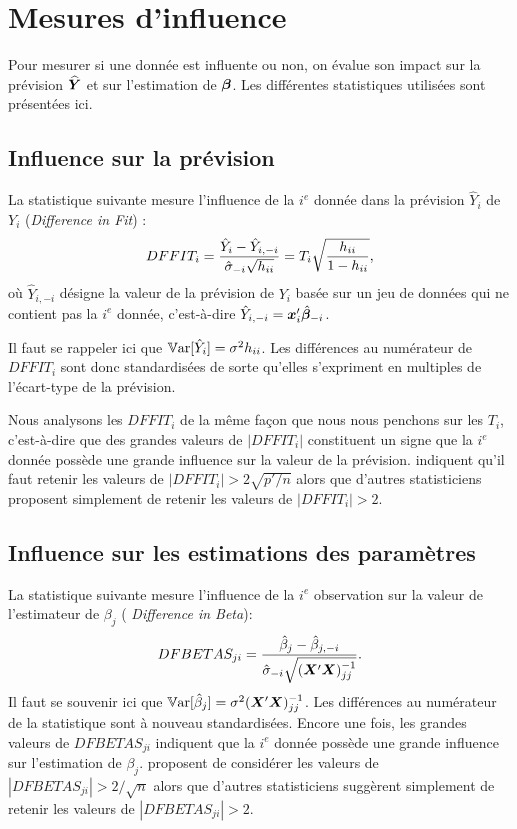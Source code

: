 \section{Mesures d'influence}

Pour mesurer si une donnée est influente ou non, on évalue son impact sur la prévision $\widehat{\bm{Y}}$ et sur l'estimation de $\bm\beta$. Les différentes statistiques utilisées sont présentées ici.

\subsection{Influence sur la prévision}
La statistique suivante mesure l'influence de la $i^e$ donnée
dans la prévision $\hat{Y}_i$ de $Y_i$ (\textit{Difference in Fit}) :
$$DFFIT_i={\hat{Y}_i-\hat{Y}_{i,-i}\over
\hat\sigma_{-i}\sqrt{h_{ii}}}=T_i\sqrt{h_{ii}\over1-h_{ii}},$$ o\`u
$\hat{Y}_{i,-i}$ désigne la valeur de la prévision de $Y_i$ basée
sur un jeu de données qui ne contient pas la $i^e$ donnée,
c'est-à-dire $\hat{Y}_{i,-i}=\bm{x}_i'\hat{\bm\beta}_{-i}$.

Il faut se rappeler ici que $\mathbb{V}\text{ar}[\hat Y_i]=\sigma^2h_{ii}$. Les différences au numérateur de $DFFIT_i$ sont donc standardisées de sorte qu'elles s'expriment en multiples de l'écart-type de la prévision.

Nous analysons les $DFFIT_i$ de la m\^eme fa\c{c}on que nous nous penchons sur les $T_i$, c'est-à-dire que des grandes valeurs de $|DFFIT_i|$ constituent un signe que la $i^e$ donnée possède une grande influence sur la valeur de la prévision. \citet{Bel_Kuh_Wel:80} indiquent qu'il faut retenir les valeurs de $|DFFIT_i|>2\sqrt{p'/n}$ alors que d'autres statisticiens proposent simplement de retenir les valeurs de $|DFFIT_i|>2$.

\subsection{Influence sur les estimations des paramètres}
La statistique suivante mesure l'influence de la $i^e$
observation sur la valeur de l'estimateur de $\beta_j$ (\textit{ Difference in Beta}):
$$DFBETAS_{ji}={\hat{\beta}_j-\hat{\beta}_{j,-i}\over
\hat\sigma_{-i}\sqrt{(\bm{X}'\bm{X})^{-1}_{jj}}}.$$
Il faut se souvenir ici que $\mathbb{V}\text{ar}[\hat\beta_j]=\sigma^2(\bm{X}'\bm{X})^{-1}_{jj}$. Les différences au numérateur de la statistique sont  à nouveau standardisées.
Encore une fois, les grandes valeurs de $DFBETAS_{ji}$ indiquent que la $i^e$ donnée possède une grande influence sur l'estimation de $\beta_j$. \citet{Bel_Kuh_Wel:80} proposent de considérer les valeurs de $|DFBETAS_{ji}|>2/\sqrt{n}$ alors que d'autres statisticiens suggèrent simplement de retenir les valeurs de $|DFBETAS_{ji}|>2$. \\


